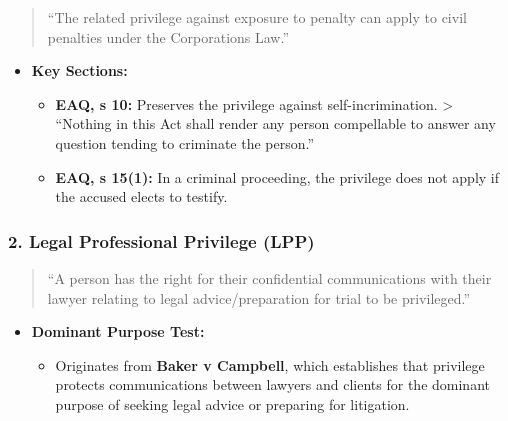 \begin{quote}
``The related privilege against exposure to penalty can apply to civil
penalties under the Corporations Law.''
\end{quote}

\begin{itemize}
\tightlist
\item
  \textbf{Key Sections:}

  \begin{itemize}
  \tightlist
  \item
    \textbf{EAQ, s 10:} Preserves the privilege against
    self-incrimination. \textgreater{} ``Nothing in this Act shall
    render any person compellable to answer any question tending to
    criminate the person.''
  \item
    \textbf{EAQ, s 15(1):} In a criminal proceeding, the privilege does
    not apply if the accused elects to testify.
  \end{itemize}
\end{itemize}

\subsubsection{\texorpdfstring{2. \textbf{Legal Professional Privilege
(LPP)}}{2. Legal Professional Privilege (LPP)}}\label{legal-professional-privilege-lpp-1}

\begin{quote}
``A person has the right for their confidential communications with
their lawyer relating to legal advice/preparation for trial to be
privileged.''
\end{quote}

\begin{itemize}
\tightlist
\item
  \textbf{Dominant Purpose Test:}

  \begin{itemize}
  \tightlist
  \item
    Originates from \textbf{Baker v Campbell}, which establishes that
    privilege protects communications between lawyers and clients for
    the dominant purpose of seeking legal advice or preparing for
    litigation.
  \end{itemize}
\end{itemize}

